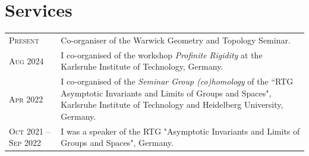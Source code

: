 \documentclass[a4paper,10pt]{article} %
\begin{document}
	
\section{Services}

%	
%
%
%
%
\begin{longtable}{>{\raggedleft\arraybackslash}p{4.2cm}p{11cm}}
	
	\textsc{Present} & Co-organiser of the Warwick Geometry and Topology Seminar.\\

    \textsc{Aug 2024} & I co-organised of the workshop \emph{Profinite Rigidity} at the Karlsruhe Institute of Technology, Germany.\\

    \textsc{Apr 2022} & I co-organised of the \emph{Seminar Group (co)homology} of the ``RTG Asymptotic Invariants and Limits of Groups and Spaces", Karlsruhe Institute of Technology and Heidelberg University, Germany.\\

    \textsc{Oct 2021 -- Sep 2022} & I was a speaker of the RTG "Asymptotic Invariants and Limits of Groups and Spaces", Germany.\\

\end{longtable}

%
%
%
\end{document}

